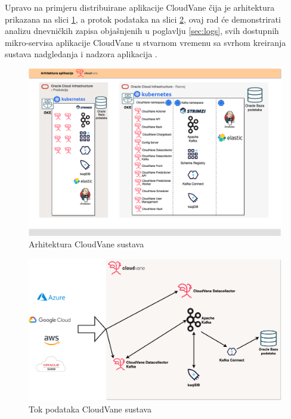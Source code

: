 \documentclass[times, utf8, diplomski]{fer}
\begin{document}
Upravo na primjeru distribuirane aplikacije CloudVane čija je arhitektura prikazana na slici \ref{fig:cloudvaneArch}, a protok podataka na slici \ref{fig:dataCloudvane}, ovaj rad će demonstrirati analizu dnevničkih zapisa objašnjenih u poglavlju \ref{sec:logs}, svih dostupnih mikro-servisa aplikacije CloudVane u stvarnom vremenu  sa svrhom kreiranja sustava nadgledanja i nadzora aplikacija .

\begin{figure}[htb]
	\centering
	\includegraphics[width=15cm]{images/CloudVaneArchitecture.png}
	\caption[Arhitektura CloudVane sustava]{Arhitektura CloudVane sustava}
	\label{fig:cloudvaneArch}
\end{figure}

\begin{figure}[htb]
	\centering
	\includegraphics[width=15cm]{images/CloudVaneData.png}
	\caption[Tok podataka CloudVane sustava]{Tok podataka  CloudVane sustava}
	\label{fig:dataCloudvane}
\end{figure}
\end{document}
